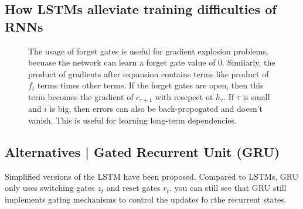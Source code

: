 \documentclass[11pt]{article}
\begin{document}
\subsection{How LSTMs alleviate training difficulties of RNNs}

\begin{figure}[H]
    \centering
    \caption*{The usage of forget gates is useful for gradient explosion problems, becuase the network can learn a forget gate value of 0. Similarly, the product of gradients after expansion contains terms like product of $f_t$ terms times other terms. If the forget gates are open, then this term becomes the gradient of $c_{\tau+1}$ with resepect ot $h_\tau$. If $\tau$ is small and $i$ is big, then errors can also be back-propogated and doesn't vanish. This is useful for learning long-term dependencies.}
\end{figure}

\subsection{Alternatives | Gated Recurrent Unit (GRU)}

\begin{minipage}[l]{.4\linewidth}
    \begin{figure}[H]
        \centering
    \end{figure}
\end{minipage}\hfill
\begin{minipage}[r]{.55\linewidth}
    Simplified versions of the LSTM have been proposed. Compared to LSTMs, GRU only uses switching gates $z_t$ and reset gates $r_t$. you can still see that GRU still implements gating mechanisms to control the updates fo rthe recurrent states.
\end{minipage}
\end{document}
